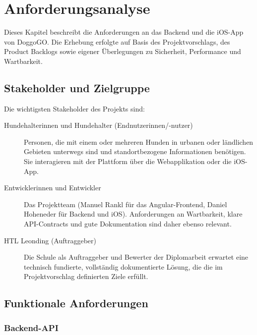\chapter{Anforderungsanalyse}
\label{chap:anforderungen}

Dieses Kapitel beschreibt die Anforderungen an das Backend und die iOS-App von DoggoGO.
Die Erhebung erfolgte auf Basis des Projektvorschlags, des Product Backlogs sowie eigener
Überlegungen zu Sicherheit, Performance und Wartbarkeit.

\section{Stakeholder und Zielgruppe}
\label{sec:stakeholder}

Die wichtigsten Stakeholder des Projekts sind:

\begin{description}
  \item[Hundehalter\-innen und Hundehalter (Endnutzer\-innen/-nutzer)]
    Personen, die mit einem oder mehreren Hunden in urbanen oder ländlichen Gebieten
    unterwegs sind und standortbezogene Informationen benötigen. Sie interagieren mit der
    Plattform über die Webapplikation oder die iOS-App.
  \item[Entwicklerinnen und Entwickler]
    Das Projektteam (Manuel Rankl für das Angular-Frontend, Daniel Hoheneder für Backend
    und iOS). Anforderungen an Wartbarkeit, klare API-Contracts und gute Dokumentation
    sind daher ebenso relevant.
  \item[HTL Leonding (Auftraggeber)]
    Die Schule als Auftraggeber und Bewerter der Diplomarbeit erwartet eine technisch
    fundierte, vollständig dokumentierte Lösung, die die im Projektvorschlag definierten
    Ziele erfüllt.
\end{description}

\section{Funktionale Anforderungen}
\label{sec:funktionale-anforderungen}

\subsection{Backend-API}
\label{subsec:fa-backend}

